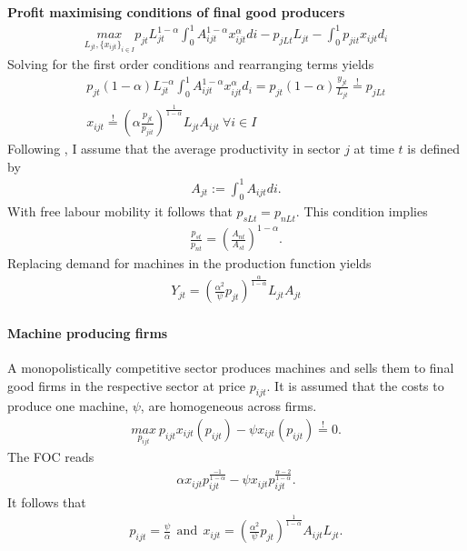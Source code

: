 \documentclass[12pt]{article}
\begin{document}
\textbf{Profit maximising conditions of final good producers}
\begin{align*}
\underset{L_{jt}, \{x_{ijt}\}_{i \in I}}{max} p_{jt} L_{jt}^{1-\alpha} \int_{0}^{1}A_{ijt}^{1-\alpha}x_{ijt}^\alpha di - p_{jLt} L_{jt} - \int_{0}^{1} p_{jit}x_{ijt} d_i
\end{align*}
Solving for the first order conditions and rearranging terms yields
\begin{align}
p_{jt}(1-\alpha) L_{jt}^{-\alpha}\int_{0}^{1}A_{ijt}^{1-\alpha}x_{ijt}^\alpha d_i= p_{jt} (1-\alpha)\frac{y_{jt}}{L_{jt}}\overset{!}{=}p_{jLt}  \label{eq:foc_demand_L}
\\
x_{ijt} \overset{!}{=} \left(\alpha\frac{p_{jt}}{p_{jit}}\right)^\frac{1}{1-\alpha}L_{jt} A_{ijt}\ \forall i\in I \label{eq:foc_demand_ma}
\end{align}
Following \cite{Acemoglu2012TheChange}, I assume that the average productivity in sector $j$ at time $t$ is defined by
\begin{align*}
A_{jt}:=\int_{0}^{1}A_{ijt}di.
\end{align*}
With free labour mobility it follows that $p_{sLt}=p_{nLt}$. This condition implies
\begin{align*}
\frac{p_{st}}{p_{nt}}=\left(\frac{A_{nt}}{A_{st}}\right)^{1-\alpha}.
\end{align*}
Replacing demand for machines in the production function yields
\begin{align*}
Y_{jt}= \left(\frac{\alpha^2}{\psi}p_{jt}\right)^{\frac{\alpha}{1-\alpha}}L_{jt}A_{jt}
\end{align*}
\paragraph{Machine producing firms}

A monopolistically competitive sector produces machines and sells them to final good firms in the respective sector at price $p_{ijt}$. It is assumed that the costs to produce one machine, $\psi$, are homogeneous across firms.
\begin{align*}
\underset{p_{ijt}}{max}\  p_{ijt}x_{ijt}(p_{ijt})-\psi x_{ijt}(p_{ijt}) \overset{!}{=}0.
\end{align*}
The FOC reads
\begin{align*}
\alpha x_{ijt}p_{ijt}^{\frac{-1}{1-\alpha}}-\psi x_{ijt}p_{ijt}^{\frac{\alpha-2}{1-\alpha}}.
\end{align*}
It follows that 
\begin{align*}
p_{ijt}=\frac{\psi}{\alpha}\ \ \text{and} \ \  x_{ijt}=\left(\frac{\alpha^2}{\psi}p_{jt}\right)^\frac{1}{1-\alpha}A_{ijt}L_{jt}.
\end{align*}
\end{document}
